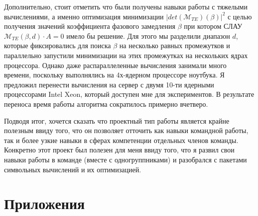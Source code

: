 \documentclass{article}
\begin{document}
Дополнительно, стоит отметить что были получены навыки работы с тяжелыми вычислениями, а именно оптимизация минимизации $|det(\mathcal{M}_{TE})(\beta)|^2$ с целью получения значений коэффициента фазового замедления $\beta$ при котором СЛАУ $\mathcal{M}_{TE}(\beta, d) \cdot A = 0$ имело бы решение. Для этого мы разделили диапазон $d$, которые фиксировались для поиска $\beta$ на несколько равных промежутков и параллельно запустили минимизации на этих промежутках на нескольких ядрах процессора. Однако даже распараллеленные вычисления занимали много времени, поскольку выполнялись на 4х-ядерном процессоре ноутбука. Я предложил перенести вычисления на сервер с двумя 10-ти ядерными процессорами Intel Xeon, который доступен мне для экспериментов. В результате переноса время работы алгоритма сократилось примерно вчетверо.

Подводя итог, хочется сказать что проектный тип работы является крайне полезным ввиду того, что он позволяет отточить как навыки командной работы, так и более узкие навыки в сферах компетенции отдельных членов команды. Конкретно этот проект был полезен для меня ввиду того, что я развил свои навыки работы в команде (вместе с одногруппниками) и разобрался с пакетами символьных вычислений и их оптимизацией. 


\newpage




\newpage

\section*{Приложения}
\end{document}
